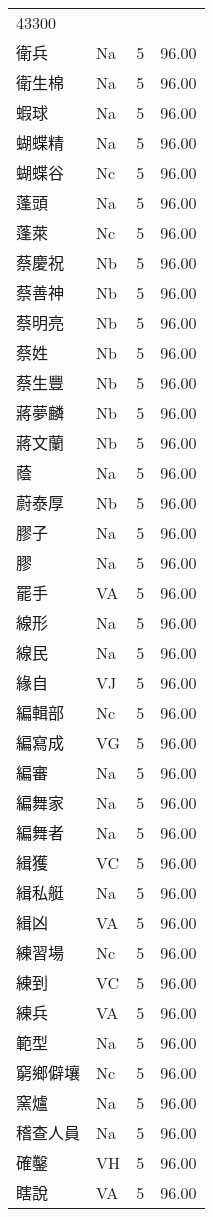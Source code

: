 \documentclass[twocolumn]{book}
\begin{document}
\begin{supertabular}{llrr}
43300\\
衛兵 & Na & 5 &  96.00\\
衛生棉 & Na & 5 &  96.00\\
蝦球 & Na & 5 &  96.00\\
蝴蝶精 & Na & 5 &  96.00\\
蝴蝶谷 & Nc & 5 &  96.00\\
蓬頭 & Na & 5 &  96.00\\
蓬萊 & Nc & 5 &  96.00\\
蔡慶祝 & Nb & 5 &  96.00\\
蔡善神 & Nb & 5 &  96.00\\
蔡明亮 & Nb & 5 &  96.00\\
蔡姓 & Nb & 5 &  96.00\\
蔡生豐 & Nb & 5 &  96.00\\
蔣夢麟 & Nb & 5 &  96.00\\
蔣文蘭 & Nb & 5 &  96.00\\
蔭 & Na & 5 &  96.00\\
蔚泰厚 & Nb & 5 &  96.00\\
膠子 & Na & 5 &  96.00\\
膠 & Na & 5 &  96.00\\
罷手 & VA & 5 &  96.00\\
線形 & Na & 5 &  96.00\\
線民 & Na & 5 &  96.00\\
緣自 & VJ & 5 &  96.00\\
編輯部 & Nc & 5 &  96.00\\
編寫成 & VG & 5 &  96.00\\
編審 & Na & 5 &  96.00\\
編舞家 & Na & 5 &  96.00\\
編舞者 & Na & 5 &  96.00\\
緝獲 & VC & 5 &  96.00\\
緝私艇 & Na & 5 &  96.00\\
緝凶 & VA & 5 &  96.00\\
練習場 & Nc & 5 &  96.00\\
練到 & VC & 5 &  96.00\\
練兵 & VA & 5 &  96.00\\
範型 & Na & 5 &  96.00\\
窮鄉僻壤 & Nc & 5 &  96.00\\
窯爐 & Na & 5 &  96.00\\
稽查人員 & Na & 5 &  96.00\\
確鑿 & VH & 5 &  96.00\\
瞎說 & VA & 5 &  96.00\\

\end{supertabular}
\end{document}
